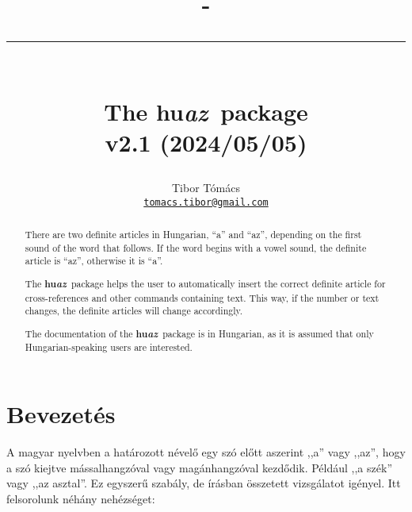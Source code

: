 \documentclass[12pt]{article}
\def\codefont{\usefont{T1}{pcrs}{m}{n}}
\newcommand{\code}{%
  \lstinline[
    delim={[is][\color{teal}\normalfont\small\sffamily]{!}{!}},
    basicstyle=\normalfont\small\codefont,
    columns=fullflexible,
    keepspaces]}
\def\huazlogo{%
  {\contourlength{.8pt}\Huge
  \sbox0{\contour{black!30}{\Huge\bfseries\sffamily\color{white}HUAZ}}%
  \mbox{}%
  \lower-\dimeval{2\ht0/3}%
  \rlap{{\color{hured}\rule{\wd0}{\dimeval{\ht0/3}}}}%
  {\color{hugreen}\rule{\wd0}{\dimeval{\ht0/3}}}%
  \llap{\usebox0}}}
\def\huaz{\textbf{\sffamily hu\itshape\color{gray}az}}
\def\huqq#1{,,{\color{gray}#1}''}
\begin{document}
\title{\huazlogo\\ The \huaz\ package\\{\large v2.1 (2024/05/05)}}
\author{Tibor Tómács\\
  {\normalsize\href{email:tomacs.tibor@gmail.com}{\nolinkurl{tomacs.tibor@gmail.com}}}}
\date{}
\maketitle

\begin{otherlanguage}{english}
\begin{abstract}
There are two definite articles in Hungarian, ``a'' and ``az'', depending on the first sound of the word that follows. If the word begins with a vowel sound, the definite article is ``az'', otherwise it is ``a''.

The \huaz\ package helps the user to automatically insert the correct definite article for cross-references and other commands containing text.
This way, if the number or text changes, the definite articles will change accordingly.

The documentation of the \huaz\ package is in Hungarian, as it is assumed that only Hungarian-speaking users are interested.
\end{abstract}
\end{otherlanguage}

\section{Bevezetés}

A magyar nyelvben a határozott névelő egy szó előtt aszerint \huqq{a} vagy \huqq{az}, hogy a szó kiejtve mássalhangzóval vagy magánhangzóval kezdődik.
Például \huqq{a szék} vagy \huqq{az asztal}.
Ez egyszerű szabály, de írásban összetett vizsgálatot igényel.
Itt felsorolunk néhány nehézséget:

\end{document}
